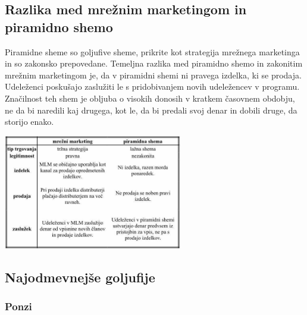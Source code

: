 \documentclass[letterpaper, titlepage, freqn]{article}
\begin{document}
\subsection{Razlika med mrežnim marketingom in piramidno shemo}
Piramidne sheme so goljufive sheme, prikrite kot strategija mrežnega marketinga in so zakonsko prepovedane. Temeljna razlika med piramidno shemo in zakonitim mrežnim marketingom je, da v piramidni shemi ni pravega izdelka, ki se prodaja. Udeleženci poskušajo zaslužiti le s pridobivanjem novih udeležencev v programu. Značilnost teh shem je obljuba o visokih donosih v kratkem časovnem obdobju, ne da bi naredili kaj drugega, kot le, da bi predali svoj denar in dobili druge, da storijo enako.

\includegraphics[height=5cm]{tab}\\

\subsection{Najodmevnejše goljufije}

\subsubsection{Ponzi}
\end{document}
